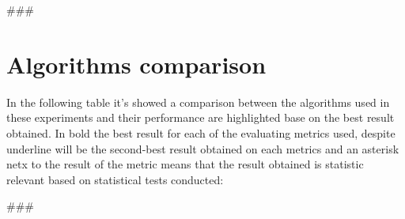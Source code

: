 
\usepackage{comment}

###
\section{Algorithms comparison}\label{sec:comparison}
In the following table it's showed a comparison between the algorithms used in these experiments
and their performance are highlighted base on the best result obtained.
In bold the best result for each of the evaluating metrics used, despite underline will be the second-best result
obtained on each metrics and an asterisk netx to the result of the metric means that the result obtained is statistic
relevant based on statistical tests conducted:

\hfill\break
###


\begin{comment}
Author = DIEGO MICCOLI
Alias = Kozen88
Organization = SWAP Research Group UniBa
Date = 27-12-2023

This mini template is not working by itself because there are latex command missing needed
to compile the file and give as output a pdf file, in addition it has been added jinja
statement in order to control the rendering of the latex file with the jinja library, for these
reasons it needs to be used with the other mini chunks in conjunction.
\end{comment}
